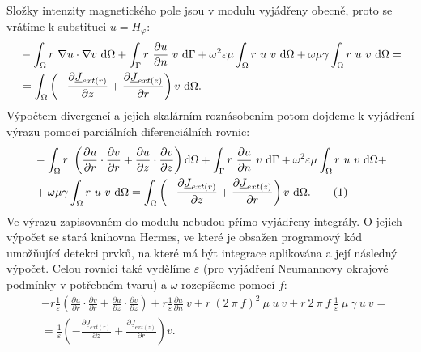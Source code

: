 \documentclass[12pt,a4paper,oneside]{article}
\numberwithin{equation}{section} %
\numberwithin{figure}{section} %
\numberwithin{table}{section} %
\newcommand{\faz}[1]{{\underline{#1}}} %
\newcommand\numberthis{\addtocounter{equation}{1}\tag{\theequation}}
\begin{document}
Složky intenzity magnetického pole jsou v modulu vyjádřeny obecně, proto se vrátíme k substituci $u = H _{\varphi}$:
\begin{equation}
\begin{split}
&- \int _{\Omega} r ~ \nabla u \cdot \nabla v ~ \ud \Omega + \int _{\Gamma} r ~ \frac{\partial u}{\partial n} ~ v ~ \ud \Gamma + \omega ^2 \varepsilon \mu \int _{\Omega} r ~ u ~ v ~ \ud \Omega + \omega \mu \gamma \int _{\Omega} r ~ u ~ v ~ \ud \Omega = 
\\
&= \int _{\Omega} \left( - \frac{\partial \faz{J} _{ext(r)}}{\partial z} + \frac{\partial \faz{J} _{ext(z)}}{\partial r} \right) v ~ \ud \Omega .
\end{split}
\end{equation}
Výpočtem divergencí a jejich skalárním roznásobením potom dojdeme k vyjádření výrazu pomocí parciálních diferenciálních rovnic:
\begin{align*}
&- \int _{\Omega} r ~ \left( \frac{\partial u}{\partial r} \cdot \frac{\partial v}{\partial r} + \frac{\partial u}{\partial z} \cdot \frac{\partial v}{\partial z} \right) \ud \Omega + \int _{\Gamma} r ~ \frac{\partial u}{\partial n} ~ v ~ \ud \Gamma + \omega ^2 \varepsilon \mu \int _{\Omega} r ~ u ~ v ~ \ud \Omega +\\
& + \omega \mu \gamma \int _{\Omega} r ~ u ~ v ~ \ud \Omega = \int _{\Omega}\left( - \frac{\partial \faz{J} _{ext(r)}}{\partial z} + \frac{\partial \faz{J} _{ext(z)}}{\partial r} \right) v ~ \ud \Omega .
\numberthis
\end{align*}
Ve výrazu zapisovaném do modulu nebudou přímo vyjádřeny integrály. O jejich výpočet se stará knihovna Hermes, ve které je obsažen programový kód umožňující detekci prvků, na které má být integrace aplikována a její následný výpočet. Celou rovnici také vydělíme $\varepsilon$ (pro vyjádření Neumannovy okrajové podmínky v potřebném tvaru) a $\omega$ rozepíšeme pomocí $f$:
\begin{equation}
\label{HphiWeakEpsilon}
\begin{split}
&- r \frac{1}{\varepsilon} \left( \frac{\partial u}{\partial r} \cdot \frac{\partial v}{\partial r} + \frac{\partial u}{\partial z} \cdot \frac{\partial v}{\partial z} \right) + r \frac{1}{\varepsilon} \frac{\partial u}{\partial n} ~ v + r ~ (2 ~ \pi ~ f) ^2 ~ \mu ~ u ~ v + r ~ 2 ~ \pi ~ f ~ \frac{1}{\varepsilon} ~ \mu ~ \gamma ~ u ~ v =\\ 
&= \frac{1}{\varepsilon} \left( - \frac{\partial \faz{J} _{ext(r)}}{\partial z} + \frac{\partial \faz{J} _{ext(z)}}{\partial r} \right) v .
\end{split}
\end{equation}
\end{document}
